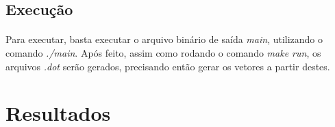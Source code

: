 \documentclass{article}
\begin{document}
			\subsection{Execução}
				\paragraph{} Para executar, basta executar o arquivo binário de saída {\it main}, utilizando o comando {\it ./main}. Após feito, assim como rodando o comando {\it make run}, os arquivos {\it .dot} serão gerados, precisando então gerar os vetores a partir destes.

		\section{Resultados}
			\paragraph{}
\end{document}
